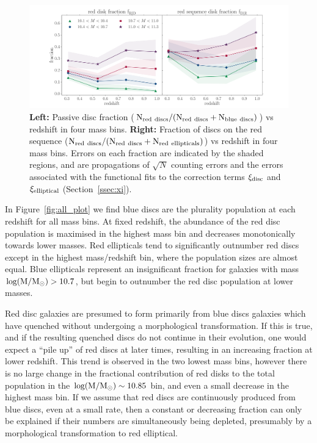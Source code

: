 \documentclass[useAMS,usenatbib]{mn2e}
\begin{document}
\begin{figure}
\centering
\includegraphics[width=\textwidth,trim={0cm 0cm 2cm 1cm},clip]{figures/red_disk_fractions.pdf}
\caption{\textbf{Left:} Passive disc fraction ($\rm N_{red~discs}/(N_{red~discs}+N_{blue~discs})$) vs redshift in four mass bins. \textbf{Right:} Fraction of discs on the red sequence ($\rm N_{red~discs}/(N_{red~discs}+N_{red~ellipticals})$) vs redshift in four mass bins. Errors on each fraction are indicated by the shaded regions, and are propagations of $\sqrt{N}$ counting errors and the errors associated with the functional fits to the correction terms $\xi_{\rm disc}$ and $\xi_{\rm elliptical}$ (Section~\ref{ssec:xi}).} 
\label{fig:f_results}
\end{figure}


In Figure~\ref{fig:all_plot} we find blue discs are the plurality population at each redshift for all mass bins. At fixed redshift, the abundance of the red disc population is maximised in the highest mass bin and decreases monotonically towards lower masses. Red ellipticals tend to significantly outnumber red discs except in the highest mass/redshift bin, where the population sizes are almost equal. Blue ellipticals represent an insignificant fraction for galaxies with mass $\rm log(M/M_{\odot})>10.7$, but begin to outnumber the red disc population at lower masses. 


Red disc galaxies are presumed to form primarily from blue discs galaxies which have quenched without undergoing a morphological transformation. If this is true, and if the resulting quenched discs do not continue in their evolution, one would expect a ``pile up'' of red discs at later times, resulting in an increasing fraction at lower redshift. This trend is observed in the two lowest mass bins, however there is no large change in the fractional contribution of red disks to the total population in the $\rm log(M/M_{\odot})\sim10.85$ bin, and even a small decrease in the highest mass bin. If we assume that red discs are continuously produced from blue discs, even at a small rate, then a constant or decreasing fraction can only be explained if their numbers are simultaneously being depleted, presumably by a morphological transformation to red elliptical.
\end{document}
